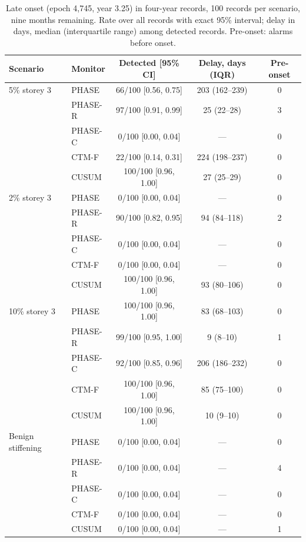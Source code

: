 \documentclass[12pt,a4paper]{article}
\newenvironment{revblock}{}{}
\newenvironment{revblock}{\begingroup\color{revcol}}{\endgroup}
\newcommand{\rtwo}[1]{#1}
\newcommand{\rtwo}[1]{{\color{revcolb}#1}}
\begin{document}
\begin{revblock}
\begin{table}[t]
\centering
\small
\caption{Late onset (epoch 4{,}745, year 3.25) in four-year records, 100 records per scenario, nine months remaining. Rate over all records with exact 95\% interval; delay in days, median (interquartile range) among detected records. Pre-onset: alarms before onset.}
\label{tab:late}
\setlength{\tabcolsep}{4pt}
\begin{tabular}{llccc}
\toprule
Scenario & Monitor & Detected [95\% CI] & Delay, days (IQR) & Pre-onset \\
\midrule
5\% storey 3 & PHASE & \rtwo{66/100 [0.56, 0.75]} & 203 (162--239) & 0  \\
 & PHASE-R & 97/100 [0.91, 0.99] & 25 (22--28) & 3 \\
 & PHASE-C & \rtwo{0/100 [0.00, 0.04]} & --- & 0  \\
 & CTM-F & 22/100 [0.14, 0.31] & 224 (198--237) & 0 \\
 & CUSUM & 100/100 [0.96, 1.00] & 27 (25--29) & 0 \\
2\% storey 3 & PHASE & \rtwo{0/100 [0.00, 0.04]} & --- & 0  \\
 & PHASE-R & 90/100 [0.82, 0.95] & 94 (84--118) & 2 \\
 & PHASE-C & \rtwo{0/100 [0.00, 0.04]} & --- & 0  \\
 & CTM-F & \rtwo{0/100 [0.00, 0.04]} & --- & 0  \\
 & CUSUM & 100/100 [0.96, 1.00] & 93 (80--106) & 0 \\
10\% storey 3 & PHASE & 100/100 [0.96, 1.00] & 83 (68--103) & 0 \\
 & PHASE-R & \rtwo{99/100 [0.95, 1.00]} & 9 (8--10) & 1  \\
 & PHASE-C & \rtwo{92/100 [0.85, 0.96]} & 206 (186--232) & 0  \\
 & CTM-F & 100/100 [0.96, 1.00] & 85 (75--100) & 0 \\
 & CUSUM & 100/100 [0.96, 1.00] & 10 (9--10) & 0 \\
Benign stiffening & PHASE & \rtwo{0/100 [0.00, 0.04]} & --- & 0  \\
 & PHASE-R & \rtwo{0/100 [0.00, 0.04]} & --- & 4  \\
 & PHASE-C & \rtwo{0/100 [0.00, 0.04]} & --- & 0  \\
 & CTM-F & \rtwo{0/100 [0.00, 0.04]} & --- & 0  \\
 & CUSUM & \rtwo{0/100 [0.00, 0.04]} & --- & 1  \\
\bottomrule
\end{tabular}
\end{table}


\end{revblock}
\end{document}
